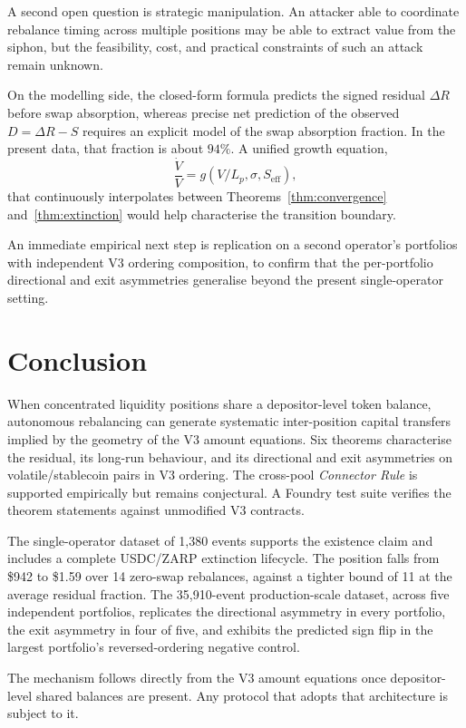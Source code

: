 \documentclass[11pt,a4paper]{article}
\theoremstyle{plain}
\begin{document}
A second open question is strategic manipulation. An attacker able to coordinate rebalance timing across multiple positions may be able to extract value from the siphon, but the feasibility, cost, and practical constraints of such an attack remain unknown.

On the modelling side, the closed-form formula predicts the signed residual $\Delta R$ before swap absorption, whereas precise net prediction of the observed $D = \Delta R - S$ requires an explicit model of the swap absorption fraction. In the present data, that fraction is about $94\%$. A unified growth equation,
\[
\frac{\dot V}{V} = g(V/L_p, \sigma, S_{\text{eff}}),
\]
that continuously interpolates between Theorems~\ref{thm:convergence} and~\ref{thm:extinction} would help characterise the transition boundary.

An immediate empirical next step is replication on a second operator's portfolios with independent V3 ordering composition, to confirm that the per-portfolio directional and exit asymmetries generalise beyond the present single-operator setting.

\section{Conclusion}\label{sec:conclusion}

When concentrated liquidity positions share a depositor-level token balance, autonomous rebalancing can generate systematic inter-position capital transfers implied by the geometry of the V3 amount equations. Six theorems characterise the residual, its long-run behaviour, and its directional and exit asymmetries on volatile/stablecoin pairs in V3 ordering. The cross-pool \emph{Connector Rule} is supported empirically but remains conjectural. A Foundry test suite verifies the theorem statements against unmodified V3 contracts.

The single-operator dataset of 1{,}380 events supports the existence claim and includes a complete USDC/ZARP extinction lifecycle. The position falls from \$942 to \$1.59 over 14 zero-swap rebalances, against a tighter bound of 11 at the average residual fraction. The 35{,}910-event production-scale dataset, across five independent portfolios, replicates the directional asymmetry in every portfolio, the exit asymmetry in four of five, and exhibits the predicted sign flip in the largest portfolio's reversed-ordering negative control.

The mechanism follows directly from the V3 amount equations once depositor-level shared balances are present. Any protocol that adopts that architecture is subject to it.
\end{document}
